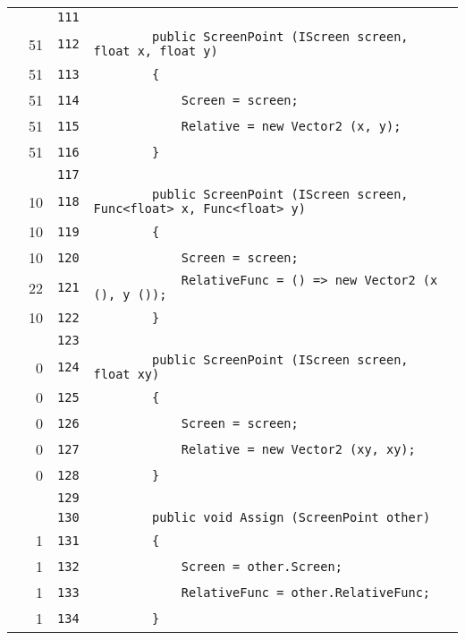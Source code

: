\documentclass[a4paper,10pt]{article}
\begin{document}
\begin{longtable}[l]{lrrl}
\cellcolor{gray} &  & \verb~111~ & \verb~~\\
\cellcolor{green} & 51 & \verb~112~ & \verb~        public ScreenPoint (IScreen screen, float x, float y)~\\
\cellcolor{green} & 51 & \verb~113~ & \verb~        {~\\
\cellcolor{green} & 51 & \verb~114~ & \verb~            Screen = screen;~\\
\cellcolor{green} & 51 & \verb~115~ & \verb~            Relative = new Vector2 (x, y);~\\
\cellcolor{green} & 51 & \verb~116~ & \verb~        }~\\
\cellcolor{gray} &  & \verb~117~ & \verb~~\\
\cellcolor{green} & 10 & \verb~118~ & \verb~        public ScreenPoint (IScreen screen, Func<float> x, Func<float> y)~\\
\cellcolor{green} & 10 & \verb~119~ & \verb~        {~\\
\cellcolor{green} & 10 & \verb~120~ & \verb~            Screen = screen;~\\
\cellcolor{green} & 22 & \verb~121~ & \verb~            RelativeFunc = () => new Vector2 (x (), y ());~\\
\cellcolor{green} & 10 & \verb~122~ & \verb~        }~\\
\cellcolor{gray} &  & \verb~123~ & \verb~~\\
\cellcolor{red} & 0 & \verb~124~ & \verb~        public ScreenPoint (IScreen screen, float xy)~\\
\cellcolor{red} & 0 & \verb~125~ & \verb~        {~\\
\cellcolor{red} & 0 & \verb~126~ & \verb~            Screen = screen;~\\
\cellcolor{red} & 0 & \verb~127~ & \verb~            Relative = new Vector2 (xy, xy);~\\
\cellcolor{red} & 0 & \verb~128~ & \verb~        }~\\
\cellcolor{gray} &  & \verb~129~ & \verb~~\\
\cellcolor{gray} &  & \verb~130~ & \verb~        public void Assign (ScreenPoint other)~\\
\cellcolor{green} & 1 & \verb~131~ & \verb~        {~\\
\cellcolor{green} & 1 & \verb~132~ & \verb~            Screen = other.Screen;~\\
\cellcolor{green} & 1 & \verb~133~ & \verb~            RelativeFunc = other.RelativeFunc;~\\
\cellcolor{green} & 1 & \verb~134~ & \verb~        }~\\

\end{longtable}
\end{document}
